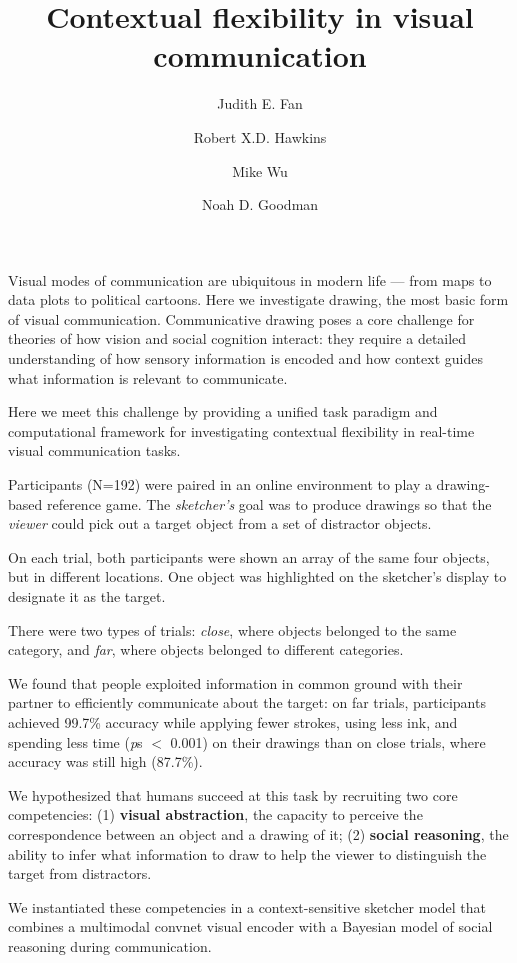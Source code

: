 \documentclass{article}
\title{Contextual flexibility in visual communication}
\author[a]{Judith E. Fan}
\author[a]{Robert X.D. Hawkins}
\author[b]{Mike Wu}
\author[a,b]{Noah D. Goodman}
\affil[a]{Department of Psychology, Stanford University}
\affil[b]{Department of Computer Science, Stanford University}
\begin{document}
\maketitle

Visual modes of communication are ubiquitous in modern life --- from maps to data plots to political cartoons. Here we investigate drawing, the most basic form of visual communication. Communicative drawing poses a core challenge for theories of how vision and social cognition interact: they require a detailed understanding of how sensory information is encoded and how context guides what information is relevant to communicate. 

Here we meet this challenge by providing a unified task paradigm and computational framework for investigating contextual flexibility in real-time visual communication tasks.

Participants (N=192) were paired in an online environment to play a drawing-based reference game. The \textit{sketcher's} goal was to produce drawings so that the \textit{viewer} could pick out a target object from a set of distractor objects.

On each trial, both participants were shown an array of the same four objects, but in different locations. One object was highlighted on the sketcher's display to designate it as the target. 

There were two types of trials: \textit{close}, where objects belonged to the same category, and \textit{far}, where objects belonged to different categories.

We found that people exploited information in common ground with their partner to efficiently communicate about the target: on far trials, participants achieved 99.7\% accuracy while applying fewer strokes, using less ink, and spending less time (\textit{p}s $<$ 0.001) on their drawings than on close trials, where accuracy was still high (87.7\%).

We hypothesized that humans succeed at this task by recruiting two core competencies: (1) \textbf{visual abstraction}, the capacity to perceive the correspondence between an object and a drawing of it; (2) \textbf{social reasoning}, the ability to infer what information to draw to help the viewer to distinguish the target from distractors. 

We instantiated these competencies in a context-sensitive sketcher model that combines a multimodal convnet visual encoder with a Bayesian model of social reasoning during communication.
\end{document}
